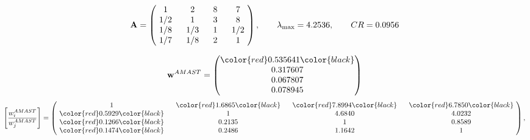 \begin{example}
\begin{equation*}
\mathbf{A} =
\begin{pmatrix}
$\,\,$ 1 $\,\,$ & $\,\,$2$\,\,$ & $\,\,$8$\,\,$ & $\,\,$7 $\,\,$ \\
$\,\,$ 1/2$\,\,$ & $\,\,$ 1 $\,\,$ & $\,\,$3$\,\,$ & $\,\,$8 $\,\,$ \\
$\,\,$ 1/8$\,\,$ & $\,\,$ 1/3$\,\,$ & $\,\,$ 1 $\,\,$ & $\,\,$ 1/2 $\,\,$ \\
$\,\,$ 1/7$\,\,$ & $\,\,$ 1/8$\,\,$ & $\,\,$2$\,\,$ & $\,\,$ 1  $\,\,$ \\
\end{pmatrix},
\qquad
\lambda_{\max} =
4.2536,
\qquad
CR = 0.0956
\end{equation*}

\begin{equation*}
\mathbf{w}^{AMAST} =
\begin{pmatrix}
\color{red} 0.535641\color{black} \\
0.317607\\
0.067807\\
0.078945
\end{pmatrix}\end{equation*}
\begin{equation*}
\left[ \frac{{w}^{AMAST}_i}{{w}^{AMAST}_j} \right] =
\begin{pmatrix}
$\,\,$ 1 $\,\,$ & $\,\,$\color{red} 1.6865\color{black} $\,\,$ & $\,\,$\color{red} 7.8994\color{black} $\,\,$ & $\,\,$\color{red} 6.7850\color{black} $\,\,$ \\
$\,\,$\color{red} 0.5929\color{black} $\,\,$ & $\,\,$ 1 $\,\,$ & $\,\,$4.6840$\,\,$ & $\,\,$4.0232  $\,\,$ \\
$\,\,$\color{red} 0.1266\color{black} $\,\,$ & $\,\,$0.2135$\,\,$ & $\,\,$ 1 $\,\,$ & $\,\,$0.8589 $\,\,$ \\
$\,\,$\color{red} 0.1474\color{black} $\,\,$ & $\,\,$0.2486$\,\,$ & $\,\,$1.1642$\,\,$ & $\,\,$ 1  $\,\,$ \\
\end{pmatrix},
\end{equation*}


\end{example}
